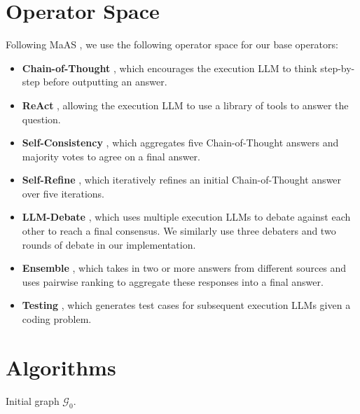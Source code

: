 \documentclass{article} %
\providecommand{\KwInit}{}
\begin{document}
\section{Operator Space}
\label{app:op_space}

Following MaAS \citep{zhang2025multi}, we use the following operator space for our base operators:

\begin{itemize}
    \item \textbf{Chain-of-Thought} \citep{wei2022chain}, which encourages the execution LLM to think step-by-step before outputting an answer.
    \item \textbf{ReAct} \citep{yao2023react}, allowing the execution LLM to use a library of tools to answer the question.
    \item \textbf{Self-Consistency} \citep{wang2022self}, which aggregates five Chain-of-Thought answers and majority votes to agree on a final answer.
    \item \textbf{Self-Refine} \citep{madaan2023self}, which iteratively refines an initial Chain-of-Thought answer over five iterations.
    \item \textbf{LLM-Debate} \citep{du2023improving}, which uses multiple execution LLMs to debate against each other to reach a final consensus. We similarly use three debaters and two rounds of debate in our implementation.
    \item \textbf{Ensemble} \citep{jiang2023llm}, which takes in two or more answers from different sources and uses pairwise ranking to aggregate these responses into a final answer.
    \item \textbf{Testing} \citep{huang2023agentcoder}, which generates test cases for subsequent execution LLMs given a coding problem.  
\end{itemize}


\section{Algorithms}
\label{app:algos}
\begin{algorithm}[H]
\caption{Online adaptation algorithm of \textsc{ASpec}}
\label{alg:online_workflow}
\SetAlgoLined
{}
\KwInit{Initial graph \(\mathcal{G}_0\).}

\end{algorithm}
\end{document}
